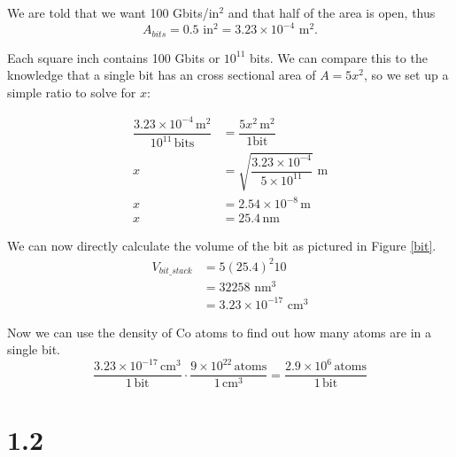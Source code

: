 \documentclass[12pt]{article}
\renewcommand{\=}[1]{\stackrel{#1}{=}} %
\theoremstyle{definition}
\theoremstyle{remark}
\begin{document}
We are told that we want 100 Gbits/in$^2$ and that half of the area is open, thus 
\[
	A_{bits} = 0.5 \,\, \text{in}^2  = 3.23 \times 10^{-4} \,\, \text{m}^2.
\]

Each square inch contains 100 Gbits or $10^11$ bits. We can compare this to the knowledge that a single  bit has an cross sectional area of $A = 5x^2$, so we set up a simple ratio to solve for $x$:

\begin{align*}
	\dfrac{3.23\times 10^{-4} \,\text{m}^2}{10^{11} \,\text{bits}} &= \dfrac{5x^2\,\text{m}^2}{1 \text{bit}}\\[3mm]
	x &= \sqrt{\dfrac{3.23\times10^{-4}}{5\times10^{11}}}\,\,\text{m} \\[3mm]
	x &= 2.54\times 10^{-8} \,\text{m}\\[3mm]
	x &= 25.4 \, \text{nm}
\end{align*}

We can now directly calculate the volume of the bit as pictured in Figure \ref{bit}.
\begin{align*}
	V_{bit\_stack} &= 5(25.4)^2 10\\[3mm]
		&=  32258\,\,\text{nm}^3\\[3mm]
		&= 3.23\times 10^{-17} \,\,\text{cm}^3
\end{align*}

Now we can use the density of Co atoms to find out how many atoms are in a single bit.
\[
\dfrac{3.23\times 10^{-17}\,\text{cm}^3}{1\,\text{bit}} \cdot \dfrac{9\times10^{22}\,\text{atoms}}{1\,\text{cm}^3} = \boxed{ \dfrac{2.9\times 10^6 \,\text{atoms}}{1\,\text{bit}} }
\]

\newpage
\section*{1.2}
\end{document}

